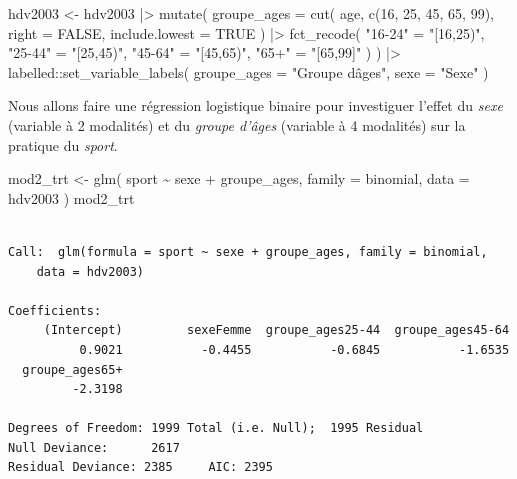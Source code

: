\documentclass[
  letterpaper,
  DIV=11,
  numbers=noendperiod,
  oneside]{scrreprt}
\newenvironment{Shaded}{\begin{snugshade}}{\end{snugshade}}
\newcommand{\AttributeTok}[1]{\textcolor[rgb]{0.40,0.45,0.13}{#1}}
\newcommand{\ConstantTok}[1]{\textcolor[rgb]{0.56,0.35,0.01}{#1}}
\newcommand{\DecValTok}[1]{\textcolor[rgb]{0.68,0.00,0.00}{#1}}
\newcommand{\FunctionTok}[1]{\textcolor[rgb]{0.28,0.35,0.67}{#1}}
\newcommand{\NormalTok}[1]{\textcolor[rgb]{0.00,0.23,0.31}{#1}}
\newcommand{\OtherTok}[1]{\textcolor[rgb]{0.00,0.23,0.31}{#1}}
\newcommand{\SpecialCharTok}[1]{\textcolor[rgb]{0.37,0.37,0.37}{#1}}
\newcommand{\StringTok}[1]{\textcolor[rgb]{0.13,0.47,0.30}{#1}}
\begin{document}
\begin{Shaded}
\begin{Highlighting}[]
\NormalTok{hdv2003 }\OtherTok{\textless{}{-}}\NormalTok{ hdv2003 }\SpecialCharTok{|\textgreater{}}
  \FunctionTok{mutate}\NormalTok{(}
    \AttributeTok{groupe\_ages =} \FunctionTok{cut}\NormalTok{(}
\NormalTok{      age, }
      \FunctionTok{c}\NormalTok{(}\DecValTok{16}\NormalTok{, }\DecValTok{25}\NormalTok{, }\DecValTok{45}\NormalTok{, }\DecValTok{65}\NormalTok{, }\DecValTok{99}\NormalTok{), }
      \AttributeTok{right =} \ConstantTok{FALSE}\NormalTok{, }
      \AttributeTok{include.lowest =} \ConstantTok{TRUE}
\NormalTok{    ) }\SpecialCharTok{|\textgreater{}}
      \FunctionTok{fct\_recode}\NormalTok{(}
        \StringTok{"16{-}24"} \OtherTok{=} \StringTok{"[16,25)"}\NormalTok{,}
        \StringTok{"25{-}44"} \OtherTok{=} \StringTok{"[25,45)"}\NormalTok{,}
        \StringTok{"45{-}64"} \OtherTok{=} \StringTok{"[45,65)"}\NormalTok{,}
        \StringTok{"65+"} \OtherTok{=} \StringTok{"[65,99]"}
\NormalTok{      ) }
\NormalTok{  ) }\SpecialCharTok{|\textgreater{}}
\NormalTok{  labelled}\SpecialCharTok{::}\FunctionTok{set\_variable\_labels}\NormalTok{(}
    \AttributeTok{groupe\_ages =} \StringTok{"Groupe d\textquotesingle{}âges"}\NormalTok{,}
    \AttributeTok{sexe =} \StringTok{"Sexe"}
\NormalTok{  )}
\end{Highlighting}
\end{Shaded}

Nous allons faire une régression logistique binaire pour investiguer
l'effet du \emph{sexe} (variable à 2 modalités) et du \emph{groupe
d'âges} (variable à 4 modalités) sur la pratique du \emph{sport}.

\begin{Shaded}
\begin{Highlighting}[]
\NormalTok{mod2\_trt }\OtherTok{\textless{}{-}} \FunctionTok{glm}\NormalTok{(}
\NormalTok{  sport }\SpecialCharTok{\textasciitilde{}}\NormalTok{ sexe }\SpecialCharTok{+}\NormalTok{ groupe\_ages,}
  \AttributeTok{family =}\NormalTok{ binomial,}
  \AttributeTok{data =}\NormalTok{ hdv2003}
\NormalTok{)}
\NormalTok{mod2\_trt}
\end{Highlighting}
\end{Shaded}

\begin{verbatim}

Call:  glm(formula = sport ~ sexe + groupe_ages, family = binomial, 
    data = hdv2003)

Coefficients:
     (Intercept)         sexeFemme  groupe_ages25-44  groupe_ages45-64  
          0.9021           -0.4455           -0.6845           -1.6535  
  groupe_ages65+  
         -2.3198  

Degrees of Freedom: 1999 Total (i.e. Null);  1995 Residual
Null Deviance:      2617 
Residual Deviance: 2385     AIC: 2395
\end{verbatim}
\end{document}
